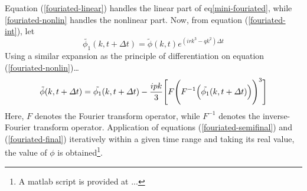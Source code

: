 \documentclass[a4paper, 12pt]{article}
\begin{document}
Equation (\ref{fouriated-linear}) handles the linear part of eq\ref{mini-fouriated}, while \ref{fouriated-nonlin} handles the nonlinear part.
Now, from equation (\ref{fouriated-int}), let
\begin{equation}
    \tilde{\phi_1}(k, t+\varDelta t) = \tilde{\phi}(k,t) e^{(irk^3 - qk^2)\varDelta t} \label{fouriated-semifinal}
\end{equation}
Using a similar expansion as the principle of differentiation on equation (\ref{fouriated-nonlin})\dots
\begin{equation}
    \tilde{\phi}(k, t + \varDelta t) = \tilde{\phi_1}(k, t + \varDelta t) 
    - \frac{ipk}{3} \Biggl[ F {\Biggl(F^{-1}\Bigl( \tilde{\phi_1}(k, t + \varDelta t)\Bigr) \Biggr)}^3\Biggr] \label{fouriated-final}
\end{equation}
Here, $F$ denotes the Fourier transform operator, while $F^{-1}$ denotes the inverse-Fourier transform operator. Application of equations (\ref{fouriated-semifinal}) and (\ref{fouriated-final})
iteratively within a given time range and taking its real value, the value of $\phi$ is obtained\footnote{A matlab script is provided at ...}.
\newpage


\end{document}

